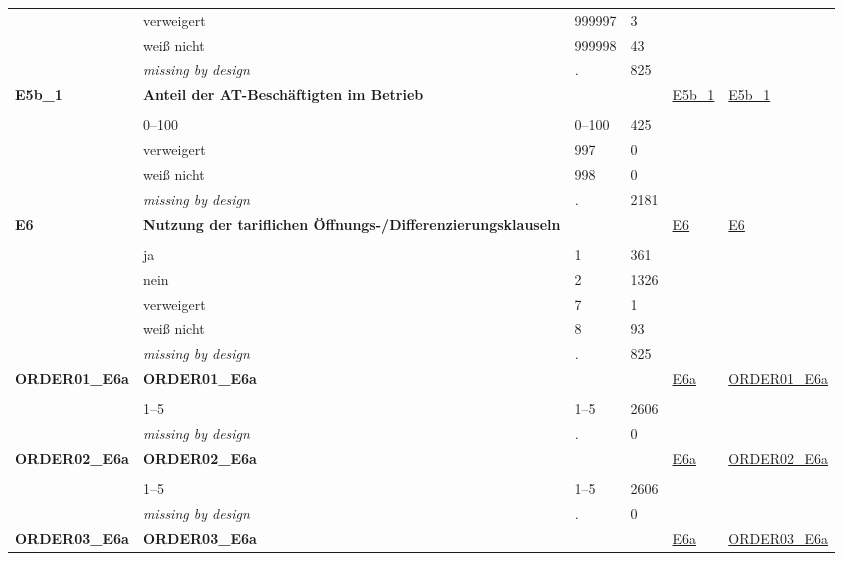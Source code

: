 \begin{longtable}{| L{2.45cm} | L{6cm} | C{1.5cm} | R{1cm} | C{2.25cm} | C{2.25cm} |}
   & verweigert & 999997 & 3 &  &  \\ 
   & weiß nicht & 999998 & 43 &  &  \\ 
   & \textit{missing by design} & \textit{.} & 825 &  &  \\ 
   \midrule
\textbf{E5b\_1}\label{var:E5b:1} & \textbf{Anteil der AT-Beschäftigten im Betrieb} &  &  & \hyperref[E5b:1]{E5b\_1} & \hyperref[var:suf:E5b:1]{E5b\_1} \\ 
   &  &  &  &  &  \\ 
   & 0--100 & 0--100 & 425 &  &  \\ 
   & verweigert & 997 & 0 &  &  \\ 
   & weiß nicht & 998 & 0 &  &  \\ 
   & \textit{missing by design} & \textit{.} & 2181 &  &  \\ 
   \midrule
\textbf{E6}\label{var:E6} & \textbf{Nutzung der tariflichen Öffnungs-/Differenzierungsklauseln} &  &  & \hyperref[E6]{E6} & \hyperref[var:suf:E6]{E6} \\ 
   &  &  &  &  &  \\ 
   & ja & 1 & 361 &  &  \\ 
   & nein & 2 & 1326 &  &  \\ 
   & verweigert & 7 & 1 &  &  \\ 
   & weiß nicht & 8 & 93 &  &  \\ 
   & \textit{missing by design} & \textit{.} & 825 &  &  \\ 
   \midrule
\textbf{ORDER01\_E6a}\label{var:ORDER01:E6a} & \textbf{ORDER01\_E6a} &  &  & \hyperref[E6a]{E6a} & \hyperref[var:suf:ORDER01:E6a]{ORDER01\_E6a} \\ 
   &  &  &  &  &  \\ 
   & 1--5 & 1--5 & 2606 &  &  \\ 
   & \textit{missing by design} & \textit{.} & 0 &  &  \\ 
   \midrule
\textbf{ORDER02\_E6a}\label{var:ORDER02:E6a} & \textbf{ORDER02\_E6a} &  &  & \hyperref[E6a]{E6a} & \hyperref[var:suf:ORDER02:E6a]{ORDER02\_E6a} \\ 
   &  &  &  &  &  \\ 
   & 1--5 & 1--5 & 2606 &  &  \\ 
   & \textit{missing by design} & \textit{.} & 0 &  &  \\ 
   \midrule
\textbf{ORDER03\_E6a}\label{var:ORDER03:E6a} & \textbf{ORDER03\_E6a} &  &  & \hyperref[E6a]{E6a} & \hyperref[var:suf:ORDER03:E6a]{ORDER03\_E6a} \\ 

\end{longtable}
